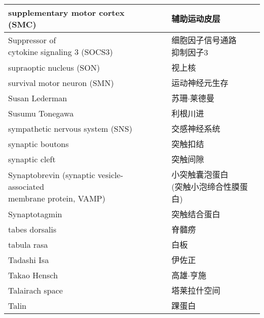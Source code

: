 \begin{longtable}{lll}
	\midrule
	supplementary motor cortex (SMC)   && 辅助运动皮层 \\
	
	\midrule
	\makecell[l]{Suppressor of \\cytokine signaling 3 (SOCS3)}  && \makecell[l]{细胞因子信号通路\\抑制因子3} \\
	
	\midrule
	supraoptic nucleus (SON)  && 视上核 \\
	
	\midrule
	survival motor neuron (SMN) && 运动神经元生存 \\
	
	\midrule
	Susan Lederman && 苏珊$\cdot$莱德曼 \\
	
	\midrule
	Susumu Tonegawa && 利根川进 \\
	
	\midrule
	sympathetic nervous system (SNS) && 交感神经系统 \\
	
	\midrule
	synaptic boutons && 突触扣结 \\
	
	\midrule
	synaptic cleft && 突触间隙 \\
	
	\midrule
	\makecell[l]{Synaptobrevin (synaptic vesicle-associated\\ membrane protein, VAMP)}   && \makecell[l]{小突触囊泡蛋白\\ (突触小泡缔合性膜蛋白)} \\
	
	\midrule
	Synaptotagmin   && 突触结合蛋白 \\
	
	\midrule
	tabes dorsalis   && 	脊髓痨  \\
	
	\midrule
	tabula rasa   && 	白板  \\
	
	\midrule
	Tadashi Isa   && 	伊佐正  \\
	
	\midrule
	Takao Hensch   && 	高雄$\cdot$亨施  \\
	
	\midrule
	Talairach space   && 	塔莱拉什空间  \\
	
	\midrule
	Talin   && 	踝蛋白  \\
	

\end{longtable}
